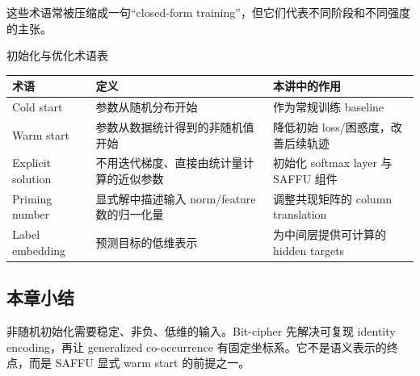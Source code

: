这些术语常被压缩成一句“closed-form training”，但它们代表不同阶段和不同强度的主张。

\begin{knowledgebox}{初始化与优化术语表}
\begin{tabularx}{\textwidth}{L{0.18\textwidth} L{0.27\textwidth} X}
\toprule
术语 & 定义 & 本讲中的作用 \\
\midrule
Cold start & 参数从随机分布开始 & 作为常规训练 baseline \\
Warm start & 参数从数据统计得到的非随机值开始 & 降低初始 loss/困惑度，改善后续轨迹 \\
Explicit solution & 不用迭代梯度、直接由统计量计算的近似参数 & 初始化 softmax layer 与 SAFFU 组件 \\
Priming number & 显式解中描述输入 norm/feature 数的归一化量 & 调整共现矩阵的 column translation \\
Label embedding & 预测目标的低维表示 & 为中间层提供可计算的 hidden targets \\
\bottomrule
\end{tabularx}
\end{knowledgebox}

\subsection{本章小结}

非随机初始化需要稳定、非负、低维的输入。Bit-cipher 先解决可复现 identity encoding，再让 generalized co-occurrence 有固定坐标系。它不是语义表示的终点，而是 SAFFU 显式 warm start 的前提之一。

